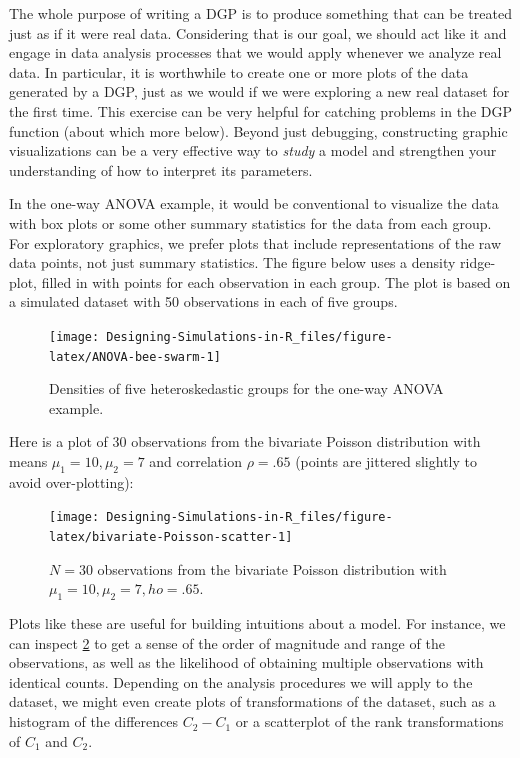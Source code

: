 \documentclass[
]{book}
\begin{document}
The whole purpose of writing a DGP is to produce something that can be treated just as if it were real data.
Considering that is our goal, we should act like it and engage in data analysis processes that we would apply whenever we analyze real data.
In particular, it is worthwhile to create one or more plots of the data generated by a DGP, just as we would if we were exploring a new real dataset for the first time.
This exercise can be very helpful for catching problems in the DGP function (about which more below).
Beyond just debugging, constructing graphic visualizations can be a very effective way to \emph{study} a model and strengthen your understanding of how to interpret its parameters.

In the one-way ANOVA example, it would be conventional to visualize the data with box plots or some other summary statistics for the data from each group.
For exploratory graphics, we prefer plots that include representations of the raw data points, not just summary statistics.
The figure below uses a density ridge-plot, filled in with points for each observation in each group.
The plot is based on a simulated dataset with 50 observations in each of five groups.

\begin{figure}

{\centering \texttt{[image: Designing-Simulations-in-R\_files/figure-latex/ANOVA-bee-swarm-1]} 

}

\caption{Densities of five heteroskedastic groups for the one-way ANOVA example.}\label{fig:ANOVA-bee-swarm}
\end{figure}

Here is a plot of 30 observations from the bivariate Poisson distribution with means \(\mu_1 = 10, \mu_2 = 7\) and correlation \(\rho = .65\) (points are jittered slightly to avoid over-plotting):

\begin{figure}

{\centering \texttt{[image: Designing-Simulations-in-R\_files/figure-latex/bivariate-Poisson-scatter-1]} 

}

\caption{$N = 30$ observations from the bivariate Poisson distribution with $\mu_1 = 10, \mu_2 = 7, ho = .65$.}\label{fig:bivariate-Poisson-scatter}
\end{figure}

Plots like these are useful for building intuitions about a model. For instance, we can inspect \ref{fig:bivariate-Poisson-scatter} to get a sense of the order of magnitude and range of the observations, as well as the likelihood of obtaining multiple observations with identical counts.
Depending on the analysis procedures we will apply to the dataset, we might even create plots of transformations of the dataset, such as a histogram of the differences \(C_2 - C_1\) or a scatterplot of the rank transformations of \(C_1\) and \(C_2\).
\end{document}
